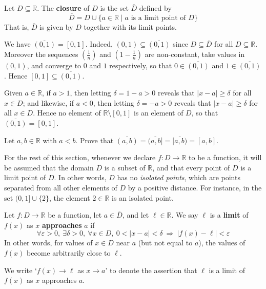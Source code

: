 \begin{definition}
\label{defClosure}
Let $D \subseteq \mathbb{R}$. The \textbf{closure} of $D$ is the set $\overline{D}$  defined by
\[ \overline{D} = D \cup \{ a \in \mathbb{R} \mid a \text{ is a limit point of } D \} \]
That is, $\overline{D}$ is given by $D$ together with its limit points.
\end{definition}

\begin{example}
We have $\overline{(0,1)} = [0,1]$. Indeed, $(0,1) \subseteq \overline{(0,1)}$ since $D \subseteq \overline{D}$ for all $D \subseteq \mathbb{R}$. Moreover the sequences $(\frac{1}{n})$ and $(1-\frac{1}{n})$ are non-constant, take values in $(0,1)$, and converge to $0$ and $1$ respectively, so that $0 \in \overline{(0,1)}$ and $1 \in \overline{(0,1)}$. Hence $[0,1] \subseteq \overline{(0,1)}$.

Given $a \in \mathbb{R}$, if $a>1$, then letting $\delta = 1-a > 0$ reveals that $|x-a| \ge \delta$ for all $x \in D$; and likewise, if $a<0$, then letting $\delta = -a > 0$ reveals that $|x-a| \ge \delta$ for all $x \in D$. Hence no element of $\mathbb{R} \setminus [0,1]$ is an element of $D$, so that $\overline{(0,1)} = [0,1]$.
\end{example}

\begin{exercise}
Let $a,b \in \mathbb{R}$ with $a<b$. Prove that $\overline{(a,b)} = \overline{(a,b]} = \overline{[a,b)} = [a,b]$.
\end{exercise}

\begin{convention}
For the rest of this section, whenever we declare $f : D \to \mathbb{R}$ to be a function, it will be assumed that the domain $D$ is a subset of $\mathbb{R}$, and that every point of $D$ is a limit point of $D$. In other words, $D$ has no \textit{isolated points}, which are points separated from all other elements of $D$ by a positive distance. For instance, in the set $(0,1] \cup \{ 2 \}$, the element $2 \in \mathbb{R}$ is an isolated point.
\end{convention}

\begin{definition}
\label{defLimitOfFunction}
Let $f : D \to \mathbb{R}$ be a function, let $a \in \overline{D}$, and let $\ell \in \mathbb{R}$. We say $\ell$ is a \textbf{limit} of $f(x)$ as $x$ \textbf{approaches} $a$ if
\[ \forall \varepsilon > 0,~ \exists \delta > 0,~ \forall x \in D,~ 0 < |x-a| < \delta ~ \Rightarrow ~ |f(x) - \ell| < \varepsilon \]
In other words, for values of $x \in D$ near $a$ (but not equal to $a$), the values of $f(x)$ become arbitrarily close to $\ell$.

We write `$f(x) \to \ell$ as $x \to a$'  to denote the assertion that $\ell$ is a limit of $f(x)$ as $x$ approaches $a$.
\end{definition}

